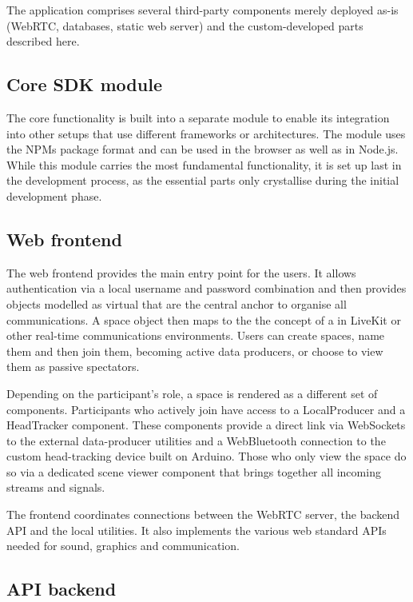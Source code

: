 The application comprises several third-party components merely deployed as-is (WebRTC, databases, static web server) and the custom-developed parts described here.

\subsection{Core SDK module}

The core functionality is built into a separate module to enable its integration into other setups that use different frameworks or architectures.
The module uses the \ac{NPM}\textquotesingle s package format and can be used in the browser as well as in Node.js.
While this module carries the most fundamental functionality, it is set up last in the development process, as the essential parts only crystallise during the initial development phase.

\subsection{Web frontend}

The web frontend provides the main entry point for the users.
It allows authentication via a local username and password combination and then provides objects modelled as virtual  that are the central anchor to organise all communications.
A space object then maps to the the concept of a  in LiveKit or other real-time communications environments.
Users can create spaces, name them and then join them, becoming active data producers, or choose to view them as passive spectators.

Depending on the participant's role, a space is rendered as a different set of components.
Participants who actively join have access to a LocalProducer and a HeadTracker component.
These components provide a direct link via WebSockets to the external data-producer utilities and a WebBluetooth connection to the custom head-tracking device built on Arduino.
Those who only view the space do so via a dedicated scene viewer component that brings together all incoming streams and signals.

The frontend coordinates connections between the WebRTC server, the backend \ac{API} and the local utilities.
It also implements the various web standard \ac{API}s needed for sound, graphics and communication.

\subsection{API backend}


